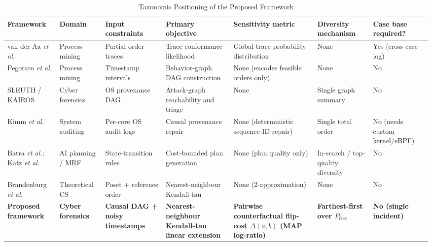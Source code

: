 \documentclass{ieeeaccess}
\newcommand{\Pfree}{P_{\mathrm{free}}}
\begin{document}
\begin{table}[!t]
\caption{Taxonomic Positioning of the Proposed Framework}
\label{tab:taxonomy}
\centering
\footnotesize
\setlength{\tabcolsep}{3pt}
\renewcommand{\arraystretch}{1.15}
\begin{tabular}{@{}>{\raggedright\arraybackslash}p{2.6cm}>{\raggedright\arraybackslash}p{1.8cm}>{\raggedright\arraybackslash}p{2.5cm}>{\raggedright\arraybackslash}p{2.9cm}>{\raggedright\arraybackslash}p{3.1cm}>{\raggedright\arraybackslash}p{2.3cm}>{\raggedright\arraybackslash}p{1.9cm}@{}}
\toprule
\textbf{Framework} & \textbf{Domain} & \textbf{Input constraints} & \textbf{Primary objective} & \textbf{Sensitivity metric} & \textbf{Diversity mechanism} & \textbf{Case base required?}\\
\midrule
van der Aa \emph{et al.} \cite{vanderAa2020} & Process mining & Partial-order traces & Trace conformance likelihood & Global trace probability distribution & None & Yes (cross-case log)\\
Pegoraro \emph{et al.} \cite{Pegoraro2020a} & Process mining & Timestamp intervals & Behavior-graph DAG construction & None (encodes feasible orders only) & None & No\\
SLEUTH / KAIROS \cite{Hossain2017,Cheng2024} & Cyber forensics & OS provenance DAG & Attack-graph reachability and triage & None & Single graph summary & No\\
Kimm \emph{et al.} \cite{Kimm2026} & System auditing & Per-core OS audit logs & Causal provenance repair & None (deterministic sequence-ID repair) & Single total order & No (needs custom kernel/eBPF)\\
Batra \emph{et al.}; Katz \emph{et al.} \cite{Batra2012,Katz2020} & AI planning / MRF & State-transition rules & Cost-bounded plan generation & None (plan quality only) & In-search / top-quality diversity & No\\
Brandenburg \emph{et al.} \cite{Brandenburg2011} & Theoretical CS & Poset + reference order & Nearest-neighbour Kendall-tau & None (2-approximation) & None & No\\
\midrule
\textbf{Proposed framework} & \textbf{Cyber forensics} & \textbf{Causal DAG + noisy timestamps} & \textbf{Nearest-neighbour Kendall-tau linear extension} & \textbf{Pairwise counterfactual flip-cost $\Delta(a,b)$ (MAP log-ratio)} & \textbf{Farthest-first over $\Pfree$} & \textbf{No (single incident)}\\
\bottomrule
\end{tabular}
\end{table}
\end{document}
